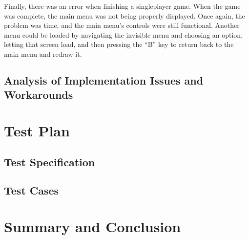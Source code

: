 \documentclass[12pt]{article} %
\begin{document}
\begin{itemize}
\begin{itemize}
\begin{itemize}
\begin{itemize}
Finally, there was an error when finishing a singleplayer game.  When the game
was complete, the main menu was not being properly displayed.  Once again, the
problem was time, and the main menu's controls were still functional.  Another
menu could be loaded by navigating the invisible menu and choosing an option,
letting that screen load, and then pressing the ``B'' key to return back to the
main menu and redraw it.

\subsection{Analysis of Implementation Issues and Workarounds} %
%
%

\section{Test Plan } %
%

\subsection{Test Specification} %
%
%

\subsection{Test Cases} %
%




\section{Summary and Conclusion}
%


\end{itemize}
\end{itemize}
\end{itemize}
\end{itemize}
\end{document}
